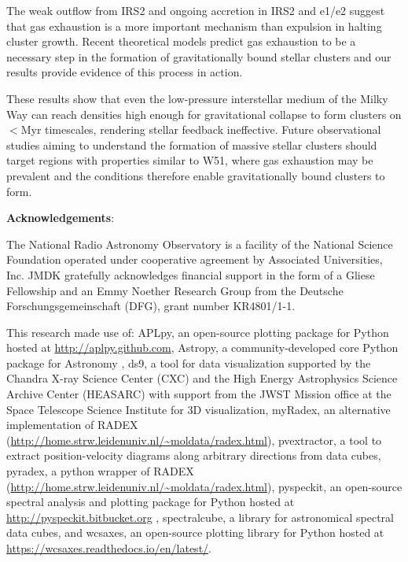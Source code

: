  The weak outflow from IRS2 and ongoing accretion in IRS2 and e1/e2 suggest
 that gas exhaustion is a more important mechanism than expulsion in halting
 cluster growth.  Recent theoretical models predict gas exhaustion to be a
 necessary step in the formation of gravitationally bound stellar clusters
 \citep[e.g.,][]{Kruijssen2012a} and our results provide evidence of this
 process in action.


These results show that even the low-pressure interstellar medium of the Milky
Way can reach densities high enough for gravitational collapse to form clusters
on $<$Myr timescales, rendering stellar feedback ineffective.  Future
observational studies aiming to understand the formation of massive stellar
clusters should target regions with properties similar to W51, where gas
exhaustion may be prevalent and the conditions therefore enable gravitationally
bound clusters to form.



\textbf{Acknowledgements}:

The National Radio Astronomy Observatory is a facility of the National Science
Foundation operated under cooperative agreement by Associated Universities,
Inc.
JMDK gratefully acknowledges financial support in the form of a Gliese
Fellowship and an Emmy Noether Research Group from the Deutsche
Forschungsgemeinschaft (DFG), grant number KR4801/1-1.

This research made use of: APLpy, an open-source plotting package for Python
hosted at \url{http://aplpy.github.com}, Astropy, a community-developed core Python
package for Astronomy \citep{Astropy-Collaboration2013a}, ds9, a tool for data
visualization supported by the Chandra X-ray Science Center (CXC) and the High
Energy Astrophysics Science Archive Center (HEASARC) with support from the JWST
Mission office at the Space Telescope Science Institute for 3D visualization,
myRadex, an alternative implementation of RADEX
(\url{http://home.strw.leidenuniv.nl/~moldata/radex.html}), pvextractor, a tool to
extract position-velocity diagrams along arbitrary directions from data cubes,
pyradex, a python wrapper of RADEX
(\url{http://home.strw.leidenuniv.nl/~moldata/radex.html}), pyspeckit, an open-source
spectral analysis and plotting package for Python hosted at
\url{http://pyspeckit.bitbucket.org} \citep{Ginsburg2011c}, spectralcube, a library
for astronomical spectral data cubes, and wcsaxes, an open-source plotting
library for Python hosted at \url{https://wcsaxes.readthedocs.io/en/latest/}.


